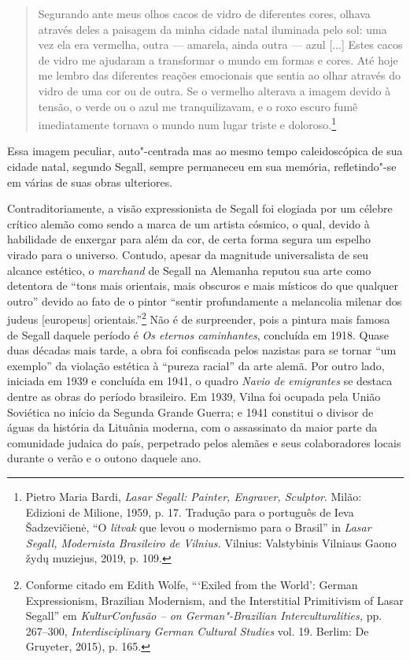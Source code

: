 \begin{quote}
Segurando ante meus olhos cacos de vidro de diferentes
cores, olhava através deles a paisagem da minha cidade natal iluminada
pelo sol: uma vez ela era vermelha, outra --- amarela, ainda outra ---
azul {[}...{]} Estes cacos de vidro me ajudaram a transformar o mundo em
formas e cores. Até hoje me lembro das diferentes reações emocionais que
sentia ao olhar através do vidro de uma cor ou de outra. Se o vermelho alterava a imagem devido à tensão, o verde ou o azul me
tranquilizavam, e o roxo escuro fumê imediatamente tornava o mundo num
lugar triste e doloroso.\footnote{Pietro Maria Bardi, \textit{Lasar
  Segall: Painter, Engraver, Sculptor}. Milão: Edizioni de Milione,
  1959, p. 17. Tradução para o português de Ieva Šadzevičienė, ``O
  \textit{litvak} que levou o modernismo para o Brasil'' in \textit{Lasar Segall,
  Modernista Brasileiro de Vilnius.} Vilnius: Valstybinis Vilniaus Gaono
  žydų muziejus, 2019, p. 109.} 
\end{quote}

Essa imagem peculiar, auto"-centrada mas
ao mesmo tempo caleidoscópica de sua cidade natal, segundo Segall,
sempre permaneceu em sua memória, refletindo"-se em várias de suas obras
ulteriores.

Contraditoriamente, a visão expressionista de Segall foi elogiada por um
célebre crítico alemão como sendo a marca de um artista cósmico, o qual,
devido à habilidade de enxergar para além da cor, de certa forma segura
um espelho virado para o universo. Contudo, apesar da magnitude
universalista de seu alcance estético, o \textit{marchand} de Segall na Alemanha
reputou sua arte como detentora de ``tons mais orientais, mais obscuros
e mais místicos do que qualquer outro'' devido ao fato de o pintor
``sentir profundamente a melancolia milenar dos judeus {[}europeus{]}
orientais.''\footnote{Conforme citado em Edith Wolfe, ```Exiled from
  the World': German Expressionism, Brazilian Modernism, and the
  Interstitial Primitivism of Lasar Segall'' em \textit{KulturConfusão -- on German"-Brazilian Interculturalities,} pp. 267--300, \textit{Interdisciplinary German Cultural Studies} vol. 19. Berlim: De
  Gruyeter, 2015), p. 165.} Não é de surpreender, pois a pintura mais
famosa de Segall daquele período é \textit{Os eternos caminhantes},
concluída em 1918. Quase duas décadas mais tarde, a obra foi confiscada
pelos nazistas para se tornar ``um exemplo'' da violação estética à
``pureza racial'' da arte alemã. Por outro lado, iniciada em 1939 e
concluída em 1941, o quadro \textit{Navio de emigrantes} se destaca dentre
as obras do período brasileiro. Em 1939, Vilna foi ocupada pela União
Soviética no início da Segunda Grande Guerra; e 1941 constitui o divisor
de águas da história da Lituânia moderna, com o assassinato da maior
parte da comunidade judaica do país, perpetrado pelos alemães e seus
colaboradores locais durante o verão e o outono daquele ano.

